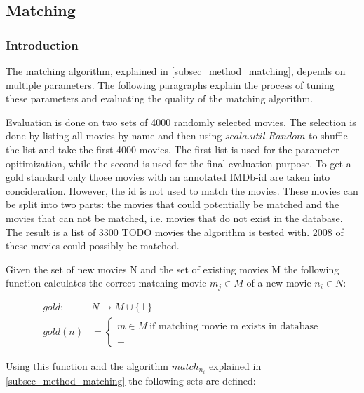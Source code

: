 \subsection{Matching}
\label{subsec_evaluation_matching}

\subsubsection{Introduction}
The matching algorithm, explained in \ref{subsec_method_matching}, depends on multiple parameters. The following paragraphs explain the process of tuning these parameters and evaluating the quality of the matching algorithm.

Evaluation is done on two sets of 4000 randomly selected movies. The selection is done by listing all movies by name and then using $scala.util.Random$ to shuffle the list and take the first 4000 movies. The first list is used for the parameter opitimization, while the second is used for the final evaluation purpose.
To get a gold standard only those movies with an annotated IMDb-id are taken into concideration. However, the id is not used to match the movies. These movies can be split into two parts: the movies that could potentially be matched and the movies that can not be matched, i.e. movies that do not exist in the database.
The result is a list of 3300 TODO movies the algorithm is tested with. 2008 of these movies could possibly be matched.

Given the set of new movies N and the set of existing movies M the following function calculates the correct matching movie $m_{j} \in M$ of a new movie $n_{i} \in N$:

\begin{align}
	gold: ~&N \rightarrow M \cup \{\bot\} \\
	gold(n) &=
		\begin{cases}
		m \in M ~\text{if matching movie m exists in database}  \\
		\bot
		\end{cases}
\end{align}

Using this function and the algorithm $match_{n_{i}}$ explained in \ref{subsec_method_matching} the following sets are defined:

